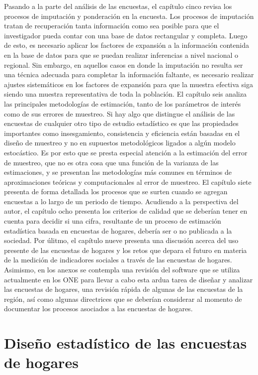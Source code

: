\documentclass[
  10pt,
  spanish,
]{book}
\begin{document}
Pasando a la parte del análisis de las encuestas, el capítulo cinco revisa los procesos de imputación y ponderación en la encuesta. Los procesos de imputación tratan de recuperación tanta información como sea posible para que el investigador pueda contar con una base de datos rectangular y completa. Luego de esto, es necesario aplicar los factores de expansión a la información contenida en la base de datos para que se puedan realizar inferencias a nivel nacional o regional. Sin embargo, en aquellos casos en donde la imputación no resulta ser una técnica adecuada para completar la información faltante, es necesario realizar ajustes sistemáticos en los factores de expansión para que la muestra efectiva siga siendo una muestra representativa de toda la población. El capítulo seis analiza las principales metodologías de estimación, tanto de los parámetros de interés como de sus errores de muestreo. Si hay algo que distingue el análisis de las encuestas de cualquier otro tipo de estudio estadístico es que las propiedades importantes como insesgamiento, consistencia y eficiencia están basadas en el diseño de muestreo y no en supuestos metodológicos ligados a algún modelo estocástico. Es por esto que se presta especial atención a la estimación del error de muestreo, que no es otra cosa que una función de la varianza de las estimaciones, y se presentan las metodologías más comunes en términos de aproximaciones teóricas y computacionales al error de muestreo. El capítulo siete presenta de forma detallada los procesos que se surten cuando se agregan encuestas a lo largo de un periodo de tiempo. Acudiendo a la perspectiva del autor, el capítulo ocho presenta los criterios de calidad que se deberían tener en cuenta para decidir si una cifra, resultante de un proceso de estimación estadística basada en encuestas de hogares, debería ser o no publicada a la sociedad. Por úlitmo, el capítulo nueve presenta una discusión acerca del uso presente de las encuestas de hogares y los retos que depara el futuro en materia de la medición de indicadores sociales a través de las encuestas de hogares. Asimismo, en los anexos se contempla una revisión del software que se utiliza actualmente en los ONE para llevar a cabo esta ardua tarea de diseñar y analizar las encuestas de hogares, una revisión rápida de algunas de las encuestas de la región, así como algunas directrices que se deberían considerar al momento de documentar los procesos asociados a las encuestas de hogares.

\hypertarget{part-diseuxf1o-estaduxedstico-de-las-encuestas-de-hogares}{%
\part{Diseño estadístico de las encuestas de hogares}\label{part-diseuxf1o-estaduxedstico-de-las-encuestas-de-hogares}}
\end{document}
